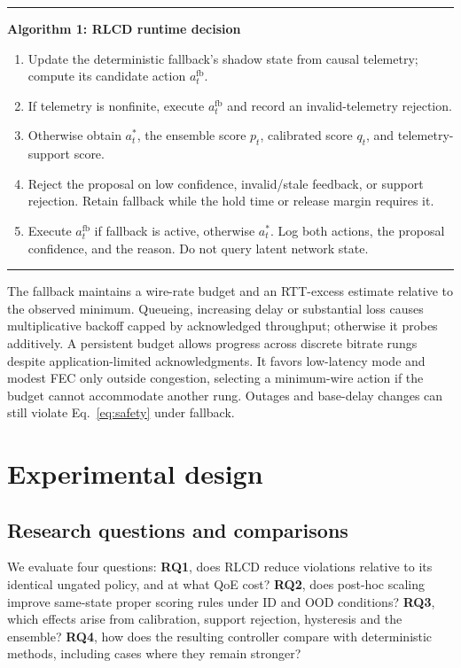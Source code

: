 \documentclass[10pt]{article}
\begin{document}
\begin{table}[t]
\centering
\begin{minipage}{.94\linewidth}
\hrule\vspace{4pt}
\textbf{Algorithm 1: RLCD runtime decision}
\begin{enumerate}
\item Update the deterministic fallback's shadow state from causal telemetry; compute its candidate action $a_t^{\mathrm{fb}}$.
\item If telemetry is nonfinite, execute $a_t^{\mathrm{fb}}$ and record an invalid-telemetry rejection.
\item Otherwise obtain $a_t^*$, the ensemble score $p_t$, calibrated score $q_t$, and telemetry-support score.
\item Reject the proposal on low confidence, invalid/stale feedback, or support rejection. Retain fallback while the hold time or release margin requires it.
\item Execute $a_t^{\mathrm{fb}}$ if fallback is active, otherwise $a_t^*$. Log both actions, the proposal confidence, and the reason. Do not query latent network state.
\end{enumerate}
\hrule
\end{minipage}
\caption{Telemetry-only deployment interface. Simulator counterfactuals are evaluation tools and are absent from this runtime decision.}
\end{table}

The fallback maintains a wire-rate budget and an RTT-excess estimate relative to the observed minimum. Queueing, increasing delay or substantial loss causes multiplicative backoff capped by acknowledged throughput; otherwise it probes additively. A persistent budget allows progress across discrete bitrate rungs despite application-limited acknowledgments. It favors low-latency mode and modest FEC only outside congestion, selecting a minimum-wire action if the budget cannot accommodate another rung. Outages and base-delay changes can still violate Eq.~\ref{eq:safety} under fallback.

\section{Experimental design}
\subsection{Research questions and comparisons}
We evaluate four questions: \textbf{RQ1}, does RLCD reduce violations relative to its identical ungated policy, and at what QoE cost? \textbf{RQ2}, does post-hoc scaling improve same-state proper scoring rules under ID and OOD conditions? \textbf{RQ3}, which effects arise from calibration, support rejection, hysteresis and the ensemble? \textbf{RQ4}, how does the resulting controller compare with deterministic methods, including cases where they remain stronger?
\end{document}
